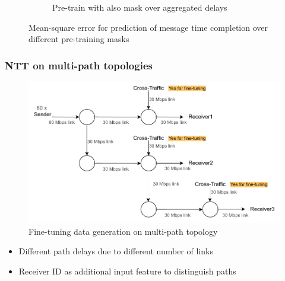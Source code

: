 \documentclass{beamer}
\begin{document}
\begin{frame}
\begin{figure}[h]
\begin{subfigure}[h]{0.5\textwidth}
        \caption{Pre-train with also mask over aggregated delays}
    \end{subfigure}
    \caption{Mean-square error for prediction of message
time completion over different pre-training masks}
    \label{fig:mct_mask}
\end{figure}
\end{frame}

\begin{frame}
\frametitle{NTT on multi-path topologies}


\begin{figure}[h]
  \begin{center}
    \includegraphics[scale=0.55]{figures/complex_topo.pdf}
    \caption{Fine-tuning data generation on multi-path topology}
    \label{fig:topo_ft_big}
  \end{center}
\end{figure}

\pause 

\begin{itemize}
    \item<1-> Different path delays due to different number of links 
    \item<1-> Receiver ID as additional input feature to distinguish paths
\end{itemize}

\end{frame}
\end{document}
